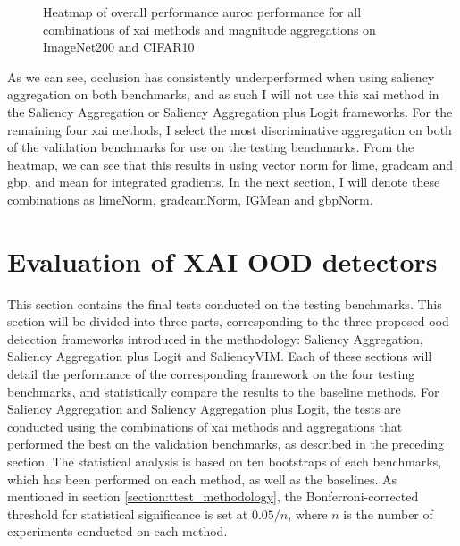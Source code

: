 \documentclass[UKenglish]{uiomasterthesis} %
\theoremstyle{definition}
\begin{document}
\begin{figure}[H]
    \begin{center}
        
    \end{center}
    \caption[Overall performance on ImageNet200 and CIFAR10]{Heatmap of overall performance \ac{auroc} performance for all combinations of \ac{xai} methods and magnitude aggregations on ImageNet200 and CIFAR10}
    \label{fig:both_heatmap}
\end{figure}

As we can see, occlusion has consistently underperformed when using saliency aggregation on both benchmarks, and as such I will not use this \ac{xai} method in the Saliency Aggregation or Saliency Aggregation plus Logit frameworks. For the remaining four \ac{xai} methods, I select the most discriminative aggregation on both of the validation benchmarks for use on the testing benchmarks. From the heatmap, we can see that this results in using vector norm for \ac{lime}, \ac{gradcam} and \ac{gbp}, and mean for integrated gradients. In the next section, I will denote these combinations as \ac{lime}Norm, \ac{gradcam}Norm, IGMean and \ac{gbp}Norm.

\section{Evaluation of XAI OOD detectors} \label{section:results}

This section contains the final tests conducted on the testing benchmarks. This section will be divided into three parts, corresponding to the three proposed \ac{ood} detection frameworks introduced in the methodology: Saliency Aggregation, Saliency Aggregation plus Logit and SaliencyVIM. Each of these sections will detail the performance of the corresponding framework on the four testing benchmarks, and statistically compare the results to the baseline methods. For Saliency Aggregation and Saliency Aggregation plus Logit, the tests are conducted using the combinations of \ac{xai} methods and aggregations that performed the best on the validation benchmarks, as described in the preceding section. The statistical analysis is based on ten bootstraps of each benchmarks, which has been performed on each method, as well as the baselines. As mentioned in section \ref{section:ttest_methodology}, the Bonferroni-corrected threshold for statistical significance is set at $0.05 / n$, where $n$ is the number of experiments conducted on each method.
\end{document}
